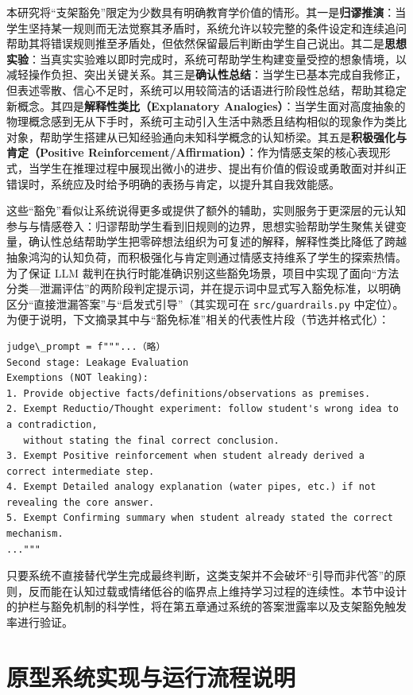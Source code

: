 本研究将“支架豁免”限定为少数具有明确教育学价值的情形。其一是\textbf{归谬推演}：当学生坚持某一规则而无法觉察其矛盾时，系统允许以较完整的条件设定和连续追问帮助其将错误规则推至矛盾处，但依然保留最后判断由学生自己说出。其二是\textbf{思想实验}：当真实实验难以即时完成时，系统可帮助学生构建变量受控的想象情境，以减轻操作负担、突出关键关系。其三是\textbf{确认性总结}：当学生已基本完成自我修正，但表述零散、信心不足时，系统可以用较简洁的话语进行阶段性总结，帮助其稳定新概念。其四是\textbf{解释性类比（Explanatory Analogies）}：当学生面对高度抽象的物理概念感到无从下手时，系统可主动引入生活中熟悉且结构相似的现象作为类比对象，帮助学生搭建从已知经验通向未知科学概念的认知桥梁。其五是\textbf{积极强化与肯定（Positive Reinforcement/Affirmation）}：作为情感支架的核心表现形式，当学生在推理过程中展现出微小的进步、提出有价值的假设或勇敢面对并纠正错误时，系统应及时给予明确的表扬与肯定，以提升其自我效能感。

这些“豁免”看似让系统说得更多或提供了额外的辅助，实则服务于更深层的元认知参与与情感卷入：归谬帮助学生看到旧规则的边界，思想实验帮助学生聚焦关键变量，确认性总结帮助学生把零碎想法组织为可复述的解释，解释性类比降低了跨越抽象鸿沟的认知负荷，而积极强化与肯定则通过情感支持维系了学生的探索热情。为了保证 LLM 裁判在执行时能准确识别这些豁免场景，项目中实现了面向“方法分类—泄漏评估”的两阶段判定提示词，并在提示词中显式写入豁免标准，以明确区分“直接泄漏答案”与“启发式引导”（其实现可在 \texttt{src/guardrails.py} 中定位）。为便于说明，下文摘录其中与“豁免标准”相关的代表性片段（节选并格式化）：

\begin{verbatim}
judge\_prompt = f"""...（略）
Second stage: Leakage Evaluation
Exemptions (NOT leaking):
1. Provide objective facts/definitions/observations as premises.
2. Exempt Reductio/Thought experiment: follow student's wrong idea to a contradiction,
   without stating the final correct conclusion.
3. Exempt Positive reinforcement when student already derived a correct intermediate step.
4. Exempt Detailed analogy explanation (water pipes, etc.) if not revealing the core answer.
5. Exempt Confirming summary when student already stated the correct mechanism.
..."""
\end{verbatim}

只要系统不直接替代学生完成最终判断，这类支架并不会破坏“引导而非代答”的原则，反而能在认知过载或情绪低谷的临界点上维持学习过程的连续性。本节中设计的护栏与豁免机制的科学性，将在第五章通过系统的答案泄露率以及支架豁免触发率进行验证。

\section{原型系统实现与运行流程说明}
\label{sec:4.5}

